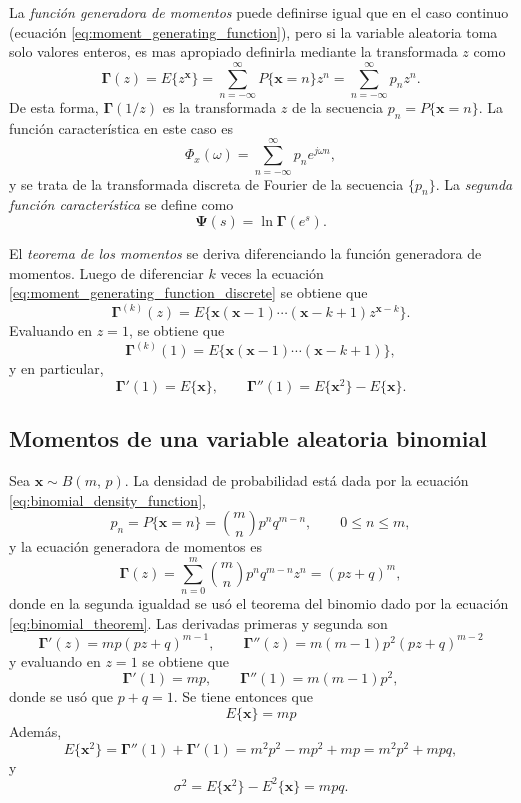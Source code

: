 \documentclass[a4paper]{report}
\newcommand{\x}{\mathbf{x}}
\newcommand{\Psibf}{\mathbf{\Psi}}
\newcommand{\Gammabf}{\mathbf{\Gamma}}
\begin{document}
La \emph{función generadora de momentos} puede definirse igual que en el caso continuo (ecuación \ref{eq:moment_generating_function}), pero si la variable aleatoria toma solo valores enteros, es mas apropiado definirla mediante la transformada \(z\) como
\begin{equation}\label{eq:moment_generating_function_discrete}
 \Gammabf(z)=E\{z^\x\}=\sum_{n=-\infty}^{\infty}P\{\x=n\}z^{n}=\sum_{n=-\infty}^{\infty}p_nz^{n}.
\end{equation}
De esta forma, \(\Gammabf(1/z)\) es la transformada \(z\) de la secuencia \(p_n=P\{\x=n\}\). La función característica en este caso es
\[
 \Phi_x(\omega)=\sum _{n=-\infty}^{\infty}p_ne^{j\omega n},
\]
y se trata de la transformada discreta de Fourier de la secuencia \(\{p_n\}\). La \emph{segunda función característica} se define como
\[
 \Psibf(s)=\ln\Gammabf(e^s).
\]

El \emph{teorema de los momentos} se deriva diferenciando la función generadora de momentos. Luego de diferenciar \(k\) veces la ecuación \ref{eq:moment_generating_function_discrete} se obtiene que
\[
 \Gammabf^{(k)}(z)=E\{\x(\x-1)\cdots(\x-k+1)z^{\x-k}\}.
\]
Evaluando en \(z=1\), se obtiene que
\[
 \Gammabf^{(k)}(1)=E\{\x(\x-1)\cdots(\x-k+1)\},
\]
y en particular, 
\[
 \Gammabf'(1)=E\{\x\},\qquad\Gammabf''(1)=E\{\x^2\}-E\{\x\}.
\]

\subsection{Momentos de una variable aleatoria binomial}

Sea \(\x\sim B(m,\,p)\). La densidad de probabilidad está dada por la ecuación \ref{eq:binomial_density_function},
\[
 p_n=P\{\x=n\}=\binom{m}{n}p^nq^{m-n},\qquad0\leq n\leq m,
\]
y la ecuación generadora de momentos es
\begin{equation}\label{eq:binomial_moment_generating_function}
  \Gammabf(z)=\sum_{n=0}^{m}\binom{m}{n}p^nq^{m-n}z^{n}=(pz+q)^m,
\end{equation}
donde en la segunda igualdad se usó el teorema del binomio dado por la ecuación \ref{eq:binomial_theorem}. Las derivadas primeras y segunda son
\[
 \Gammabf'(z)=mp(pz+q)^{m-1},\qquad \Gammabf''(z)=m(m-1)p^2(pz+q)^{m-2}
\]
y evaluando en \(z=1\) se obtiene que
\[
 \Gammabf'(1)=mp,\qquad \Gammabf''(1)=m(m-1)p^2,
\]
donde se usó que \(p+q=1\). Se tiene entonces que
\[
 E\{\x\}=mp
\]
Además,
\[
 E\{\x^2\}=\Gammabf''(1)+\Gammabf'(1)=m^2p^2-mp^2+mp=m^2p^2+mpq,
\]
y
\[
 \sigma^2=E\{\x^2\}-E^2\{\x\}=mpq.
\]
\end{document}
